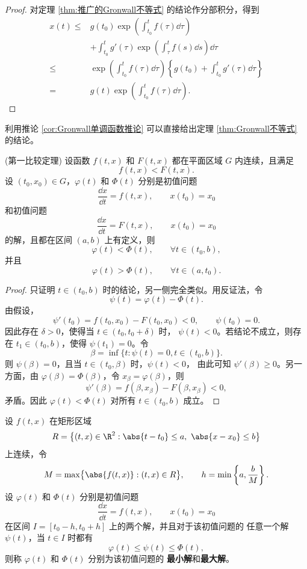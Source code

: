 \begin{proof}
	对定理 \ref{thm:推广的Gronwall不等式} 的结论作分部积分，得到
	\[
	\begin{aligned}
		x(t)\leq{}&g(t_0)
		\exp\left(\int_{t_0}^{t}f(\tau)\dd\tau\right)\\
		&+\int_{t_0}^{t}g'(\tau)
		\exp\left(\int_{\tau}^{t}f(s)\dd s\right)\dd\tau\\
		\leq{}&\exp\left(\int_{t_0}^{t}f(\tau)\dd\tau\right)
		\left\{g(t_0)+\int_{t_0}^{t}g'(\tau)\dd\tau\right\}\\
		={}&g(t)\exp\left(\int_{t_0}^{t}f(\tau)\dd\tau\right).
	\end{aligned}
	\]
\end{proof}

利用推论 \ref{cor:Gronwall单调函数推论} 可以直接给出定理
\ref{thm:Gronwall不等式} 的结论。

\begin{theorem}\label{thm:第一比较定理}(第一比较定理)
	设函数 $f(t,x)$ 和 $F(t,x)$ 都在平面区域 $G$ 内连续，且满足
	\[
		f(t,x)<F(t,x).
	\]
	设 $(t_0,x_0)\in G$，$\varphi(t)$ 和 $\Phi(t)$ 分别是初值问题
	\[
		\dfrac{\dd x}{\dd t}=f(t,x),
		\qquad x(t_0)=x_0
	\]
	和初值问题
	\[
		\dfrac{\dd x}{\dd t}=F(t,x),
		\qquad x(t_0)=x_0
	\]
	的解，且都在区间 $(a,b)$ 上有定义，则
	\[
		\varphi(t)<\Phi(t),
		\qquad \forall t\in(t_0,b),
	\]
	并且
	\[
		\varphi(t)>\Phi(t),
		\qquad \forall t\in(a,t_0).
	\]
\end{theorem}

\begin{proof}
	只证明 $t\in(t_0,b)$ 时的结论，另一侧完全类似。用反证法，令
	\[
		\psi(t)=\varphi(t)-\Phi(t).
	\]
	由假设，
	\[
		\psi'(t_0)=f(t_0,x_0)-F(t_0,x_0)<0,
		\qquad \psi(t_0)=0.
	\]
	因此存在 $\delta>0$，使得当 $t\in(t_0,t_0+\delta)$ 时，
	$\psi(t)<0$。若结论不成立，则存在 $t_1\in(t_0,b)$，使得
	$\psi(t_1)=0$。令
	\[
		\beta=\inf\bigl\{t:\psi(t)=0, t\in(t_0,b)\bigr\}.
	\]
	则 $\psi(\beta)=0$，且当 $t\in(t_0,\beta)$ 时，$\psi(t)<0$，
	由此可知 $\psi'(\beta)\geq0$。另一方面，由
	$\varphi(\beta)=\Phi(\beta)$，令 $x_\beta=\varphi(\beta)$，则
	\[
		\psi'(\beta)
		=f(\beta,x_\beta)-F(\beta,x_\beta)<0,
	\]
	矛盾。因此 $\varphi(t)<\Phi(t)$ 对所有 $t\in(t_0,b)$ 成立。
\end{proof}

\begin{definition}\label{def:最大解与最小解}
	设 $f(t,x)$ 在矩形区域
	\[
		R=\bigl\{(t,x)\in\R^2:
		\abs{t-t_0}\leq a,
		\ \abs{x-x_0}\leq b\bigr\}
	\]
	上连续，令
	\[
		M=\max\bigl\{\abs{f(t,x)}:(t,x)\in R\bigr\},
		\qquad
		h=\min\left\{a,\dfrac{b}{M}\right\}.
	\]
	设 $\varphi(t)$ 和 $\Phi(t)$ 分别是初值问题
	\[
		\dfrac{\dd x}{\dd t}=f(t,x),
		\qquad x(t_0)=x_0
	\]
	在区间 $I=[t_0-h,t_0+h]$ 上的两个解，并且对于该初值问题的
	任意一个解 $\psi(t)$，当 $t\in I$ 时都有
	\[
		\varphi(t)\leq\psi(t)\leq\Phi(t),
	\]
	则称 $\varphi(t)$ 和 $\Phi(t)$ 分别为该初值问题的
	\textbf{最小解}和\textbf{最大解}。
\end{definition}

